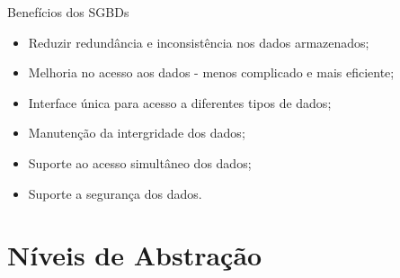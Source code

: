\documentclass[xcolor=x11names,compress]{beamer}
\begin{document}
\begin{frame}{Benefícios dos SGBDs}

\begin{itemize}

\item Reduzir redundância e inconsistência nos dados armazenados;

\item Melhoria no acesso aos dados - menos complicado e mais eficiente;

\item Interface única para acesso a diferentes tipos de dados;

\item Manutenção da intergridade dos dados;

\item Suporte ao acesso simultâneo dos dados;

\item Suporte a segurança dos dados.

\end{itemize}

\end{frame}

\section[Abstração]{Níveis de Abstração}
\end{document}
